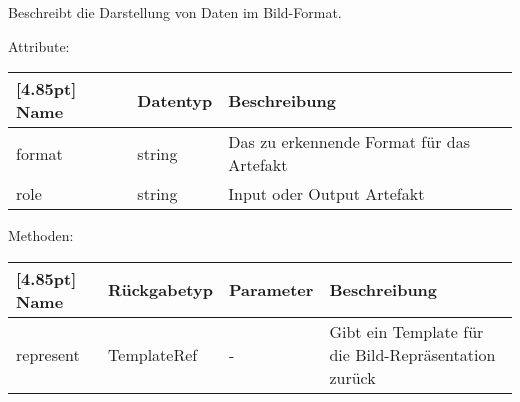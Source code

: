 			Beschreibt die Darstellung von Daten im Bild-Format.\newline
			
				Attribute:
				\begin{center}
					\renewcommand{\arraystretch}{1.5}
					\setlength\tabcolsep{5pt}
					\begin{tabularx}{\textwidth}{|l|l|X|}
						\hline
						\rowcolor[gray]{0.75}[4.85pt]					
						Name & Datentyp & Beschreibung \\ \hline
						format & string & Das zu erkennende Format für das Artefakt \\ \hline
						role & string & Input oder Output Artefakt \\ \hline
					\end{tabularx}
				\end{center}
				
				Methoden:
				\begin{center}
				\setlength\tabcolsep{5pt}
					\renewcommand{\arraystretch}{1.5}
						\begin{tabularx}{\textwidth}{|l|l|l|X|}
						\hline
						\rowcolor[gray]{0.75}[4.85pt]
						Name & Rückgabetyp & Parameter & Beschreibung \\ \hline
						represent & TemplateRef & - & Gibt ein Template für die Bild-Repräsentation zurück \\ \hline
						\end{tabularx}
				\end{center}
